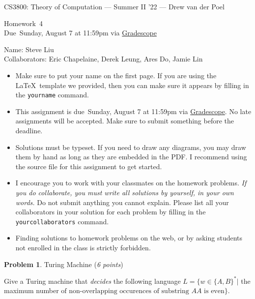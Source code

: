 \documentclass[11pt]{article}
\newcommand{\yourname}{}
\newcommand{\yourcollaborators}{}
\theoremstyle{definition}
\newcommand{\instructor}{Drew van der Poel}
\newcommand{\hwnum}{4}
\newcommand{\hwdue}{Sunday, August 7 at 11:59pm via \href{https://www.gradescope.com/courses/406943}{Gradescope}}
\theoremstyle{theorem}
\newtheorem{prob}{Problem}
\begin{document}
{\Large 
\begin{center}{CS3800: Theory of Computation} --- Summer II '22 --- \instructor \end{center}}
{\large
\vspace{10pt}
\noindent Homework~\hwnum \vspace{2pt}\\
Due~\hwdue}

\bigskip
{\large
\noindent Name: \yourname Steve Liu  \vspace{2pt}\\ Collaborators: Eric Chapelaine, Derek Leung, Ares Do, Jamie Lin \yourcollaborators}

\vspace{15pt}
\begin{itemize}

\item Make sure to put your name on the first page.  If you are using the \LaTeX~template we provided, then you can make sure it appears by filling in the \texttt{yourname} command.

\item This assignment is due~\hwdue.  No late assignments will be accepted.  Make sure to submit something before the deadline.

\item Solutions must be typeset.  If you need to draw any diagrams, you may draw them by hand as long as they are embedded in the PDF.  I recommend using the source file for this assignment to get started.

\item I encourage you to work with your classmates on the homework problems. \emph{If you do collaborate, you must write all solutions by yourself, in your own words.}  Do not submit anything you cannot explain.  Please list all your collaborators in your solution for each problem by filling in the \texttt{yourcollaborators} command.

\item Finding solutions to homework problems on the web, or by asking students not enrolled in the class is strictly forbidden.

\end{itemize}



\newpage

\begin{prob} Turing Machine (\emph{6 points})\end{prob}

Give a Turing machine that \emph{decides} the following language $L = \{ w \in \{A,B\}^* |$ the maximum number 
$ \text{of non-overlapping occurences of substring~} AA \text{~is even}\}$.
\end{document}
